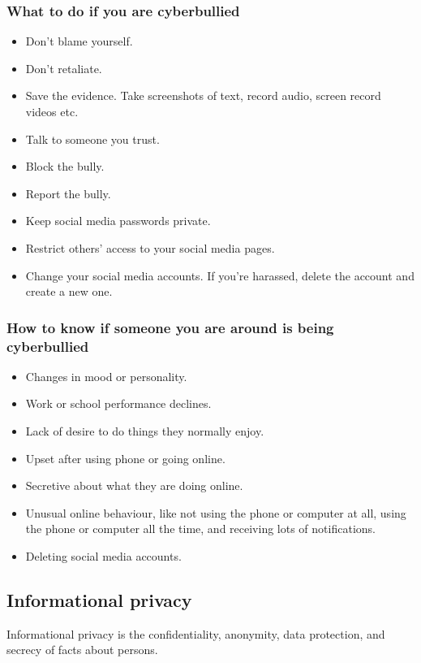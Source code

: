 \documentclass[11pt]{article}
\begin{document}
\subsubsection{What to do if you are cyberbullied}
\label{sec:org5c51ace}
\begin{itemize}
\item Don't blame yourself.
\item Don't retaliate.
\item Save the evidence. Take screenshots of text, record audio, screen record videos etc.
\item Talk to someone you trust.
\item Block the bully.
\item Report the bully.
\item Keep social media passwords private.
\item Restrict others' access to your social media pages.
\item Change your social media accounts. If you're harassed, delete the account and create a new one.
\end{itemize}
\subsubsection{How to know if someone you are around is being cyberbullied}
\label{sec:orgaae437b}
\begin{itemize}
\item Changes in mood or personality.
\item Work or school performance declines.
\item Lack of desire to do things they normally enjoy.
\item Upset after using phone or going online.
\item Secretive about what they are doing online.
\item Unusual online behaviour, like not using the phone or computer at all, using the phone or computer all the time, and receiving lots of notifications.
\item Deleting social media accounts.
\end{itemize}
\subsection{Informational privacy}
\label{sec:orga4a2e9f}
Informational privacy is the confidentiality, anonymity, data protection, and secrecy of facts about persons.
\end{document}
